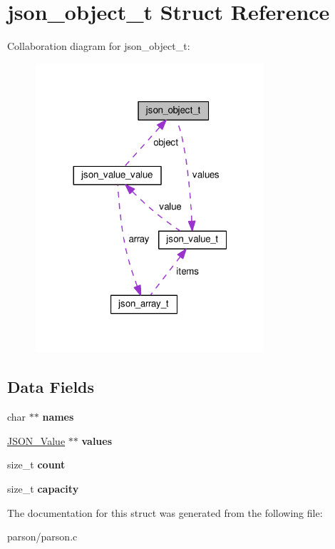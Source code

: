 \hypertarget{structjson__object__t}{\section{json\-\_\-object\-\_\-t Struct Reference}
\label{structjson__object__t}
}


Collaboration diagram for json\-\_\-object\-\_\-t\-:\nopagebreak
\begin{figure}[H]
\begin{center}
\leavevmode
\includegraphics[width=240pt]{structjson__object__t__coll__graph}
\end{center}
\end{figure}
\subsection*{Data Fields}
\begin{DoxyCompactItemize}
\item 
\hypertarget{structjson__object__t_a26fc633cf551a2621e172633486c85ef}{char $\ast$$\ast$ {\bfseries names}}\label{structjson__object__t_a26fc633cf551a2621e172633486c85ef}

\item 
\hypertarget{structjson__object__t_a39e2a988b9b2caaf33034e245a7ee8c0}{\hyperlink{structjson__value__t}{J\-S\-O\-N\-\_\-\-Value} $\ast$$\ast$ {\bfseries values}}\label{structjson__object__t_a39e2a988b9b2caaf33034e245a7ee8c0}

\item 
\hypertarget{structjson__object__t_a76d971a3c552bc58ba9f0d5fceae9806}{size\-\_\-t {\bfseries count}}\label{structjson__object__t_a76d971a3c552bc58ba9f0d5fceae9806}

\item 
\hypertarget{structjson__object__t_ad721fc6ca6a3d6ba3bc506576622aab0}{size\-\_\-t {\bfseries capacity}}\label{structjson__object__t_ad721fc6ca6a3d6ba3bc506576622aab0}

\end{DoxyCompactItemize}


The documentation for this struct was generated from the following file\-:\begin{DoxyCompactItemize}
\item 
parson/parson.\-c\end{DoxyCompactItemize}
